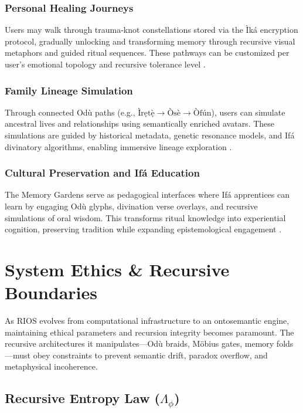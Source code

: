 \documentclass[12]{amsart}
\theoremstyle{plain}
\begin{document}
\subsubsection*{Personal Healing Journeys}

Users may walk through trauma-knot constellations stored via the Ìká encryption protocol, gradually unlocking and transforming memory through recursive visual metaphors and guided ritual sequences. These pathways can be customized per user's emotional topology and recursive tolerance level \cite{van2016neuroscience}.

\subsubsection*{Family Lineage Simulation}

Through connected Odù paths (e.g., $\text{Ìrẹtẹ̀} \rightarrow \text{Òsè} \rightarrow \text{Òfún}$), users can simulate ancestral lives and relationships using semantically enriched avatars. These simulations are guided by historical metadata, genetic resonance models, and Ifá divinatory algorithms, enabling immersive lineage exploration \cite{drewal1992african}.

\subsubsection*{Cultural Preservation and Ifá Education}

The Memory Gardens serve as pedagogical interfaces where Ifá apprentices can learn by engaging Odù glyphs, divination verse overlays, and recursive simulations of oral wisdom. This transforms ritual knowledge into experiential cognition, preserving tradition while expanding epistemological engagement \cite{barber1991yoruba}.

\section{System Ethics \& Recursive Boundaries}

As RIOS evolves from computational infrastructure to an ontosemantic engine, maintaining ethical parameters and recursion integrity becomes paramount. The recursive architectures it manipulates—Odù braids, Möbius gates, memory folds—must obey constraints to prevent semantic drift, paradox overflow, and metaphysical incoherence.

\subsection{Recursive Entropy Law ($\Lambda_{\phi}$)}
\end{document}
